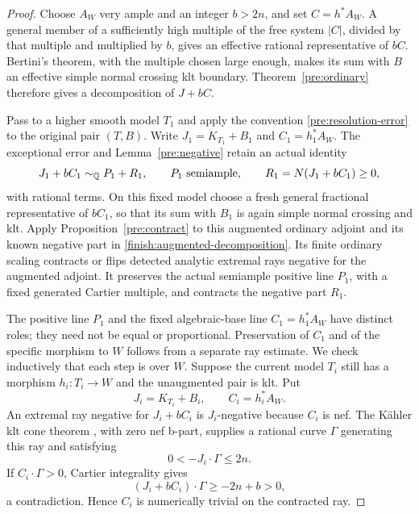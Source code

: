 \begin{proof}
Choose \(A_W\) very ample and an integer \(b>2n\), and set
\(C=h^*A_W\). A general member of a sufficiently high multiple of
the free system \(|C|\), divided by that multiple and multiplied by
\(b\), gives an effective rational representative of \(bC\).
Bertini's theorem, with the multiple chosen large enough, makes its
sum with \(B\) an effective simple normal crossing klt boundary.
Theorem~\ref{pre:ordinary} therefore gives a decomposition of \(J+bC\).

Pass to a higher smooth model \(T_1\) and apply the convention
\eqref{pre:resolution-error} to the original pair \((T,B)\). Write
\(J_1=K_{T_1}+B_1\) and \(C_1=h_1^*A_W\). The exceptional error and
Lemma~\ref{pre:negative} retain an actual identity
\begin{equation}\label{finish:augmented-decomposition}
 J_1+bC_1\sim_{\mathbb Q} P_1+R_1,\qquad
 P_1\text{ semiample},\qquad R_1=N(J_1+bC_1)\geq0,
\end{equation}
with rational terms. On this fixed model choose a fresh general
fractional representative of \(bC_1\), so that its sum with \(B_1\)
is again simple normal crossing and klt.
Apply Proposition~\ref{pre:contract} to this augmented ordinary
adjoint and its known negative part in
\eqref{finish:augmented-decomposition}. Its finite ordinary scaling
contracts or flips detected analytic extremal rays negative for the
augmented adjoint. It preserves the actual semiample positive line
\(P_1\), with a fixed generated Cartier multiple, and contracts the
negative part \(R_1\).

The positive line \(P_1\) and the fixed algebraic-base line
\(C_1=h_1^*A_W\) have distinct roles; they need not be equal or
proportional. Preservation of \(C_1\) and of the specific morphism
to \(W\) follows from a separate ray estimate. We check inductively
that each step is over \(W\). Suppose the current
model \(T_i\) still has a morphism \(h_i:T_i\to W\) and the unaugmented
pair is klt. Put
\[
 J_i=K_{T_i}+B_i,\qquad C_i=h_i^*A_W.
\]
An extremal ray negative for \(J_i+bC_i\) is \(J_i\)-negative because
\(C_i\) is nef. The K\"ahler klt cone theorem
\cite[Theorem~1.3]{HX}, with zero nef b-part, supplies a rational curve
\(\Gamma\) generating this ray and satisfying
\[
 0<-J_i\cdot\Gamma\leq2n.
\]
If \(C_i\cdot\Gamma>0\), Cartier integrality gives
\[
 (J_i+bC_i)\cdot\Gamma\geq-2n+b>0,
\]
a contradiction. Hence \(C_i\) is numerically trivial on the contracted
ray.


\end{proof}
